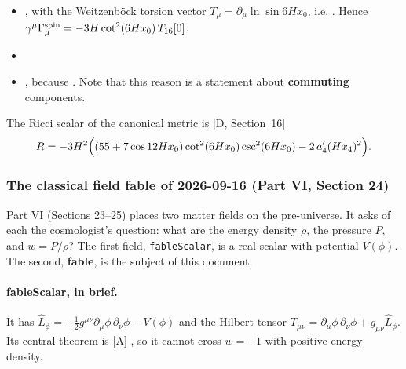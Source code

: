 \begin{itemize}
  \item {},
        with the Weitzenb\"ock torsion vector $T_\mu=\partial_\mu\ln\sin 6Hx_0$, i.e.
        .
        Hence $\gamma^\mu\Gamma^{\rm spin}_\mu=-3H\cot^2(6Hx_0)\,T_{16}[0]$.
  \item {}
  \item {},
        because .
        Note that this reason is a statement about \textbf{commuting} components.
\end{itemize}
The Ricci scalar of the canonical metric is [D, Section~16]
\begin{equation}
  R=-3H^2\Bigl((55+7\cos 12Hx_0)\cot^2(6Hx_0)\csc^2(6Hx_0)-2\,a_4'(Hx_4)^2\Bigr).
\end{equation}

\subsubsection{The classical field fable of 2026-09-16 (Part VI, Section 24)}
\label{fnd:fable}\label{sec:3.1.12}

Part VI (Sections 23--25) places two matter fields on the pre-universe. It asks of each the
cosmologist's question: what are the energy density $\rho$, the pressure $P$, and $w=P/\rho$? The
first field, \texttt{fableScalar}, is a real scalar with potential $V(\phi)$. The second,
\textbf{fable}, is the subject of this document.

\paragraph{fableScalar, in brief.} It has
$\hat L_\phi=-\tfrac12 g^{\mu\nu}\partial_\mu\phi\,\partial_\nu\phi-V(\phi)$ and the Hilbert tensor
$T_{\mu\nu}=\partial_\mu\phi\,\partial_\nu\phi+g_{\mu\nu}\hat L_\phi$. Its central theorem is [A]
,
so it cannot cross $w=-1$ with positive energy density.


